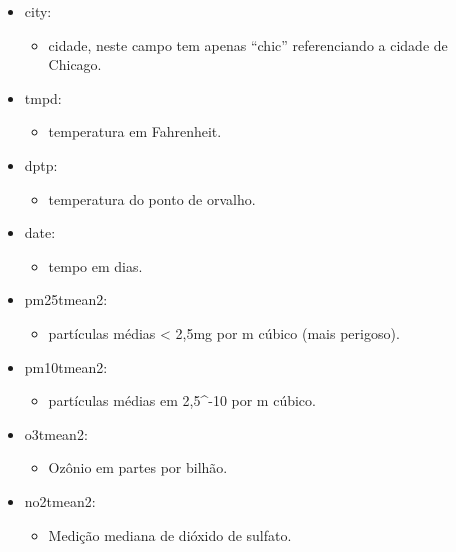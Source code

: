 \documentclass[a4paper]{book}
\providecommand{\tightlist}{%
  \setlength{\itemsep}{0pt}\setlength{\parskip}{0pt}}
\begin{document}
\begin{itemize}
\tightlist
\item
  city:

  \begin{itemize}
  \tightlist
  \item
    cidade, neste campo tem apenas ``chic'' referenciando a cidade de Chicago.
  \end{itemize}
\item
  tmpd:

  \begin{itemize}
  \tightlist
  \item
    temperatura em Fahrenheit.
  \end{itemize}
\item
  dptp:

  \begin{itemize}
  \tightlist
  \item
    temperatura do ponto de orvalho.
  \end{itemize}
\item
  date:

  \begin{itemize}
  \tightlist
  \item
    tempo em dias.
  \end{itemize}
\item
  pm25tmean2:

  \begin{itemize}
  \tightlist
  \item
    partículas médias \textless{} 2,5mg por m cúbico (mais perigoso).
  \end{itemize}
\item
  pm10tmean2:

  \begin{itemize}
  \tightlist
  \item
    partículas médias em 2,5\^{}-10 por m cúbico.
  \end{itemize}
\item
  o3tmean2:

  \begin{itemize}
  \tightlist
  \item
    Ozônio em partes por bilhão.
  \end{itemize}
\item
  no2tmean2:

  \begin{itemize}
  \tightlist
  \item
    Medição mediana de dióxido de sulfato.
  \end{itemize}
\end{itemize}
\end{document}
